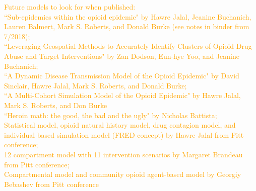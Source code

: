 \documentclass[12pt]{article}
\begin{document}
\textcolor{orange}{Future models to look for when published: \\
``Sub-epidemics within the opioid epidemic" by Hawre Jalal, Jeanine Buchanich, Lauren Balmert, Mark S. Roberts, and Donald Burke (see notes in binder from 7/2018); \\ 
``Leveraging Geospatial Methods to Accurately Identify Clusters of Opioid Drug Abuse and Target Interventions" by Zan Dodson, Eun-hye Yoo, and Jeanine Buchanich; \\
``A Dynamic Disease Transmission Model of the Opioid Epidemic" by David Sinclair, Hawre Jalal, Mark S. Roberts, and Donald Burke; \\ 
``A Multi-Cohort Simulation Model of the Opioid Epidemic" by Hawre Jalal, Mark S. Roberts, and Don Burke \\
``Heroin math: the good, the bad and the ugly" by Nicholas Battista; \\
Statistical model, opioid natural history model, drug contagion model, and individual based simulation model (FRED concept) by Hawre Jalal from Pitt conference; \\
12 compartment model with 11 intervention scenarios by Margaret Brandeau from Pitt conference; \\
Compartmental model and community opioid agent-based model by Georgiy Bebashev from Pitt conference}
\end{document}
